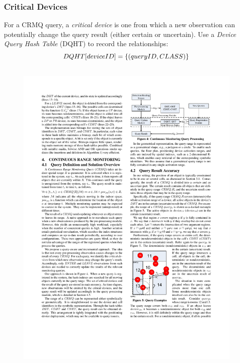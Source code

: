 \begin{frame}
\frametitle{Critical Devices}

\scriptsize{
For a \textrm{CRMQ} query, a \emph{critical device} is one from which a new observation can potentially change the query result (either certain or uncertain). Use a \emph{Device Query Hash Table} (DQHT) to record the relationships:
\vspace{-5pt}
\begin{equation*}
  \mathnormal{DQHT[deviceID] = \{ (queryID, CLASS) \}}
\end{equation*}
}

\begin{columns}[c]

    \vspace{-20pt}
    \begin{figure}[tb]
      \includegraphics[width=\columnwidth]{figures/2-2/2-2-5.pdf}
    \end{figure}


\end{columns}
\end{frame}

